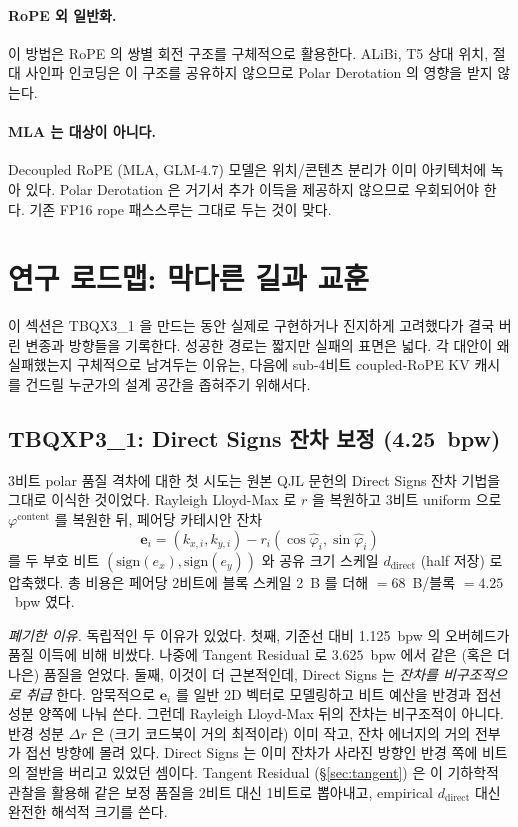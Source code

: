 \documentclass[10pt,twocolumn]{article}
\begin{document}
\paragraph{RoPE 외 일반화.}
이 방법은 RoPE 의 쌍별 회전 구조를 구체적으로 활용한다. ALiBi, T5 상대 위치, 절대 사인파 인코딩은 이 구조를 공유하지 않으므로 Polar Derotation 의 영향을 받지 않는다.

\paragraph{MLA 는 대상이 아니다.}
Decoupled RoPE (MLA, GLM-4.7) 모델은 위치/콘텐츠 분리가 이미 아키텍처에 녹아 있다. Polar Derotation 은 거기서 추가 이득을 제공하지 않으므로 우회되어야 한다. 기존 FP16 rope 패스스루는 그대로 두는 것이 맞다.

\section{연구 로드맵: 막다른 길과 교훈}
\label{sec:deadends}

이 섹션은 TBQX3\_1 을 만드는 동안 실제로 구현하거나 진지하게 고려했다가 결국 버린 변종과 방향들을 기록한다. 성공한 경로는 짧지만 실패의 표면은 넓다. 각 대안이 왜 실패했는지 구체적으로 남겨두는 이유는, 다음에 sub-4비트 coupled-RoPE KV 캐시를 건드릴 누군가의 설계 공간을 좁혀주기 위해서다.

\subsection{TBQXP3\_1: Direct Signs 잔차 보정 (4.25~bpw)}

3비트 polar 품질 격차에 대한 첫 시도는 원본 QJL 문헌의 Direct Signs 잔차 기법을 그대로 이식한 것이었다. Rayleigh Lloyd-Max 로 $r$ 을 복원하고 3비트 uniform 으로 $\varphi^{\text{content}}$ 를 복원한 뒤, 페어당 카테시안 잔차
\begin{equation*}
\mathbf{e}_i = (k_{x,i}, k_{y,i}) - r_i(\cos\hat\varphi_i,\sin\hat\varphi_i)
\end{equation*}
를 두 부호 비트 $(\text{sign}(e_x),\text{sign}(e_y))$ 와 공유 크기 스케일 $d_{\text{direct}}$ (half 저장) 로 압축했다. 총 비용은 페어당 2비트에 블록 스케일 2~B 를 더해 $= 68$~B/블록 $= 4.25$~bpw 였다.

\emph{폐기한 이유.} 독립적인 두 이유가 있었다. 첫째, 기준선 대비 1.125~bpw 의 오버헤드가 품질 이득에 비해 비쌌다. 나중에 Tangent Residual 로 $3.625$~bpw 에서 같은 (혹은 더 나은) 품질을 얻었다. 둘째, 이것이 더 근본적인데, Direct Signs 는 \emph{잔차를 비구조적으로 취급} 한다. 암묵적으로 $\mathbf{e}_i$ 를 일반 2D 벡터로 모델링하고 비트 예산을 반경과 접선 성분 양쪽에 나눠 쓴다. 그런데 Rayleigh Lloyd-Max 뒤의 잔차는 비구조적이 아니다. 반경 성분 $\Delta r$ 은 (크기 코드북이 거의 최적이라) 이미 작고, 잔차 에너지의 거의 전부가 접선 방향에 몰려 있다. Direct Signs 는 이미 잔차가 사라진 방향인 반경 쪽에 비트의 절반을 버리고 있었던 셈이다. Tangent Residual (\S\ref{sec:tangent}) 은 이 기하학적 관찰을 활용해 같은 보정 품질을 2비트 대신 1비트로 뽑아내고, empirical $d_{\text{direct}}$ 대신 완전한 해석적 크기를 쓴다.
\end{document}

